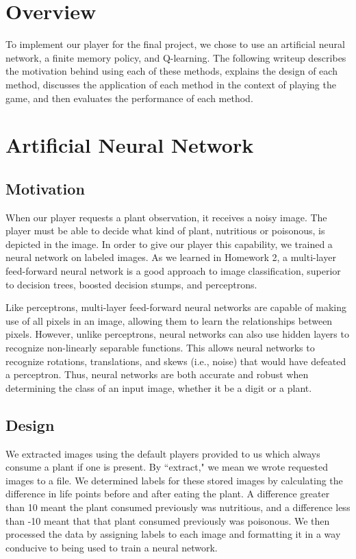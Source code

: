 \documentclass[solution, letterpaper]{cs121}
\begin{document}


\section*{Overview}
\hspace{4mm} To implement our player for the final project, we chose to use an artificial neural network, a finite memory policy, and Q-learning. The following writeup describes the motivation behind using each of these methods, explains the design of each method, discusses the application of each method in the context of playing the game, and then evaluates the performance of each method. 

\section{Artificial Neural Network}
\subsection{Motivation}
\hspace{4mm} When our player requests a plant observation, it receives a noisy image. The player must be able to decide what kind of plant, nutritious or poisonous, is depicted in the image. In order to give our player this capability, we trained a neural network on labeled images. As we learned in Homework 2, a multi-layer feed-forward neural network is a good approach to image classification, superior to decision trees, boosted decision stumps, and perceptrons. 

Like perceptrons, multi-layer feed-forward neural networks are capable of making use of all pixels in an image, allowing them to learn the relationships between pixels. However, unlike perceptrons, neural networks can also use hidden layers to recognize non-linearly separable functions. This allows neural networks to recognize rotations, translations, and skews (i.e., noise) that would have defeated a perceptron. Thus, neural networks are both accurate and robust when determining the class of an input image, whether it be a digit or a plant.

\subsection{Design}
\hspace{4mm} We extracted images using the default players provided to us which always consume a plant if one is present. By ``extract," we mean we wrote requested images to a file. We determined labels for these stored images by calculating the difference in life points before and after eating the plant. A difference greater than 10 meant the plant consumed previously was nutritious, and a difference less than -10 meant that that plant consumed previously was poisonous. We then processed the data by assigning labels to each image and formatting it in a way conducive to being used to train a neural network.
\end{document}

